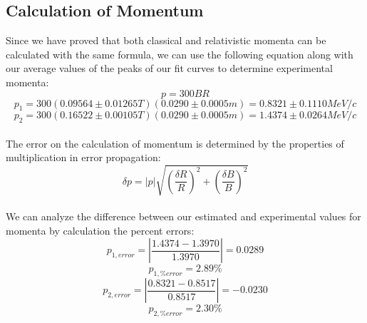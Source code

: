 \subsection{Calculation of Momentum}
Since we have proved that both classical and relativistic momenta can be calculated with the same formula, we can use the following equation along with our average values of the peaks of our fit curves to determine experimental momenta:
\begin{equation} p=300BR\end{equation}
\begin{equation} p_1=300(0.09564\pm0.01265 T)(0.0290\pm 0.0005m)=0.8321\pm0.1110 MeV/c\end{equation}
\begin{equation} p_2=300(0.16522\pm0.00105 T)(0.0290\pm 0.0005m)=1.4374\pm0.0264 MeV/c\end{equation}\\
The error on the calculation of momentum is determined by the properties of multiplication in error propagation:
\begin{equation} \delta p= |p|\sqrt{(\frac{\delta R}{R})^2 + (\frac{\delta B}{B})^2}\end{equation}\\
We can analyze the difference between our estimated and experimental values for momenta by calculation the percent errors: 
\begin{equation} p_{1,error}=|\frac{1.4374-1.3970}{1.3970}|=0.0289\end{equation}
\begin{equation} p_{1,\% error}= 2.89 \% \end{equation}
\begin{equation} p_{2,error}=|\frac{0.8321-0.8517}{0.8517}|=-0.0230\end{equation}
\begin{equation} p_{2,\% error}= 2.30 \% \end{equation}

